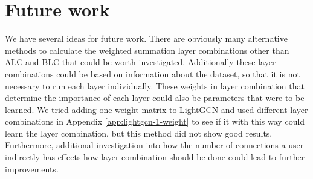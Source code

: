 \section{Future work}
We have several ideas for future work.
There are obviously many alternative methods to calculate the weighted summation layer combinations other than ALC and BLC that could be worth investigated.
Additionally these layer combinations could be based on information about the dataset, so that it is not necessary to run each layer individually.
These weights in layer combination that determine the importance of each layer could also be parameters that were to be learned.
We tried adding one weight matrix to LightGCN and used different layer combinations in Appendix \ref{app:lightgcn-1-weight} to see if it with this way could learn the layer combination, but this method did not show good results.
Furthermore, additional investigation into how the number of connections a user indirectly has effects how layer combination should be done could lead to further improvements.




